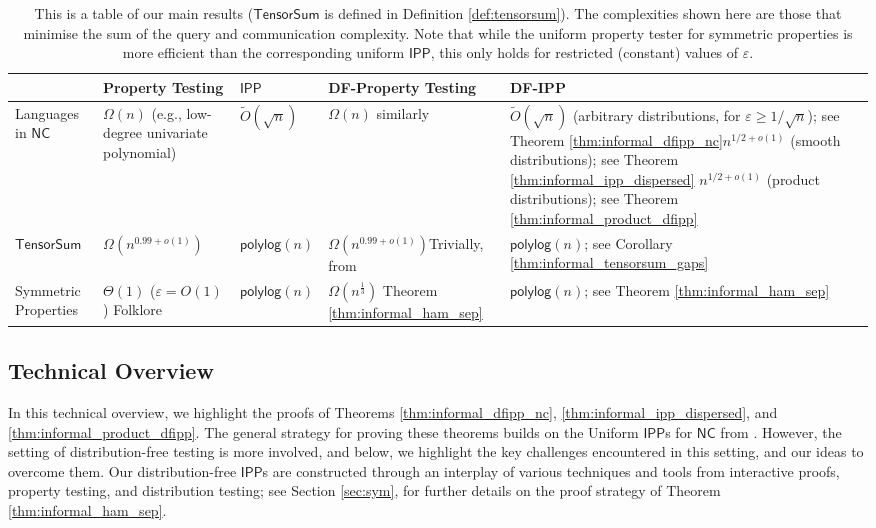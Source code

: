 \documentclass[10pt,a4paper]{article}
\newcommand{\polylog}{\mathsf{polylog}}
\newcommand{\NC}{\mathsf{NC}}
\newcommand{\IPP}{\mathsf{IPP}}
\newcommand{\TensorSum}{\mathsf{TensorSum}}
\newcommand{\eps}{\varepsilon}
\begin{document}
\begin{table}[!h]
\begin{tabular}{ | m{5em} | m{2.75cm}| m{1.75cm} | m{2.25cm}| m{5.5cm} | } 
  \hline
  & Property \quad Testing & $\IPP$ &  DF-Property Testing & DF-IPP\\
  \hline
  Languages in $\NC$ & $\Omega(n)$ (e.g., low-degree univariate polynomial) & $\tilde{O}(\sqrt{n})$ \newline \cite{RVW,RR20_batch_polylog} & $\Omega(n)$ similarly & $\tilde{O}(\sqrt{n})$ (arbitrary distributions, for $\varepsilon \geq 1/\sqrt{n}$); see Theorem \ref{thm:informal_dfipp_nc}\newline $n^{1/2+o(1)}$ (smooth distributions); see Theorem \ref{thm:informal_ipp_dispersed} \newline $n^{1/2+o(1)}$  (product distributions); see Theorem \ref{thm:informal_product_dfipp}\\ 
  \hline
  $\TensorSum$ & $\Omega(n^{0.99+o(1)})$ \newline \cite{GR18} & $\polylog(n)$  \newline \cite{GR18} & $\Omega(n^{0.99+o(1)})$\newline Trivially, from \cite{GR18} & $\polylog(n)$; see Corollary \ref{thm:informal_tensorsum_gaps} \\ 
  \hline
  Symmetric Properties & $\Theta(1)$ ($\varepsilon=O(1)$) Folklore \newline & $\polylog(n)$ \cite{RVW} & $\Omega(n^{\frac{1}{3}})$ \newline Theorem \ref{thm:informal_ham_sep}& $\polylog(n)$; see Theorem \ref{thm:informal_ham_sep} \\ 
  \hline
\end{tabular}
\caption{
This is a table of our main results ($\TensorSum$ is defined in Definition \ref{def:tensorsum}). The complexities shown here are those that minimise the sum of the query and communication complexity. Note that while the uniform property tester for symmetric properties is more efficient than the corresponding uniform $\IPP$, this only holds for restricted (constant) values of $\eps$.}
\label{tbl:results}
\end{table}

\subsection{Technical Overview}
\label{sec:techniques}
In this technical overview, we highlight the proofs of Theorems \ref{thm:informal_dfipp_nc}, \ref{thm:informal_ipp_dispersed}, and \ref{thm:informal_product_dfipp}. The general strategy for proving these theorems builds on the Uniform $\IPP$s for $\NC$ from \cite{RVW,RR20_batch_polylog}. However, the setting of distribution-free testing is more involved, and below, we highlight the key challenges encountered in this setting, and our ideas to overcome them. Our distribution-free $\IPP$s are constructed through an interplay of various techniques and tools from interactive proofs, property testing, and distribution testing; see Section \ref{sec:sym}, for further details on the proof strategy of Theorem \ref{thm:informal_ham_sep}. 
\end{document}
